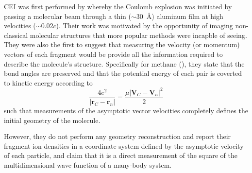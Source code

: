 CEI was first performed by \citet{Vager89} whereby the Coulomb explosion was initiated by passing a molecular beam through a thin ($\sim$\SI{30}{\angstrom}) aluminum film at high velocities ($\sim$$0.02c$). Their work was motivated by the opportunity of imaging non-classical molecular structures that more popular methods were incapble of seeing. They were also the first to suggest that measuring the velocity (or momentum) vectors of each fragment would be provide all the information required to describe the molecule's structure. Specifically for methane (), they state that the  bond angles are preserved and that the potential energy of each  pair is coverted to kinetic energy according to
$$ \frac{4e^2}{|\mathbf{r}_C - \mathbf{r}_n|} = \frac{\mu|\mathbf{V}_C - \mathbf{V}_n|^2}{2} $$
such that measurements of the asymptotic vector velocities completely defines the initial geometry of the molecule.

However, they do not perform any geometry reconstruction and report their fragment ion densities in a coordinate system defined by the asymptotic velocity of each particle, and claim that it is a direct measurement of the square of the multidimensional wave function of a many-body system.


